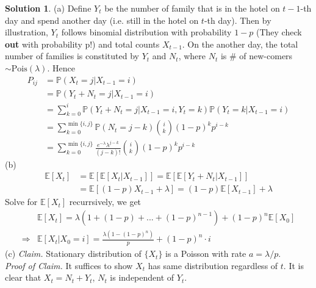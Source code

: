 \documentclass[a4paper, 10pt]{article}
\theoremstyle{definition}
\theoremstyle{hSol}
\newtheorem*{solution}{Solution}
\begin{document}
\begin{solution} (a) Define $Y_t$ be the number of family that is in the hotel on $t-1$-th day and spend another day (i.e. still in the hotel on $t$-th day). Then by illustration, $Y_t$ follows binomial distribution with probability $1-p$ (They check \textbf{out} with probability p!) and total counts $X_{t-1}$. On the another day, the total number of families is constituted by $Y_t$ and $N_t$, where $N_t$ is \# of new-comers $\sim\text{Pois}(\lambda)$. Hence
\begin{equation}
  \begin{split}
    P_{ij} &= \mathbb{P}\left(X_t=j|X_{t-1}=i\right) \\
    &= \mathbb{P}\left(Y_t+N_t=j|X_{t-1}=i\right)\\
    &= \sum_{k=0}^i \mathbb{P}\left(Y_t+N_t=j|X_{t-1}=i,Y_t=k\right)\mathbb{P}\left(Y_t=k|X_{t-1}=i\right) \\
    &= \sum_{k=0}^{\min\{i,j\}} \mathbb{P}\left(N_t=j-k\right) \binom{i}{k}(1-p)^kp^{i-k}\\
    &= \sum_{k=0}^{\min\{i,j\}}\frac{e^{-\lambda}\lambda^{j-k}}{(j-k)!}\binom{i}{k}(1-p)^kp^{i-k}
  \end{split}
\end{equation}
(b)
\begin{equation}
  \begin{split}
    \mathbb{E}\left[X_t\right] &= \mathbb{E}\left[\mathbb{E}\left[X_t|X_{t-1}\right]\right] = \mathbb{E}\left[\mathbb{E}\left[Y_t+N_t|X_{t-1}\right]\right] \\
    &= \mathbb{E}\left[(1-p)X_{t-1}+\lambda\right] = (1-p)\mathbb{E}\left[X_{t-1}\right] + \lambda
  \end{split}
\end{equation}
Solve for $\mathbb{E}\left[X_t\right]$ recurrsively, we get
\begin{equation}
  \begin{split}
    &\mathbb{E}\left[X_t\right] = \lambda(1+(1-p)+...+(1-p)^{n-1})+(1-p)^n \mathbb{E}\left[X_0\right]\\
    \Rightarrow & \mathbb{E}\left[X_t|X_0=i\right] = \frac{\lambda(1-(1-p)^n)}{p} + (1-p)^n \cdot i
  \end{split}
\end{equation}
(c) \textit{Claim.} Stationary distribution of $\{X_t\}$ is a Poisson with rate $a=\lambda/p$. \\
\textit{Proof of Claim.} It suffices to show $X_t$ has same distribution regardless of $t$. It is clear that $X_t = N_t + Y_t$, $N_t$ is independent of $Y_t$.

\end{solution}
\end{document}
